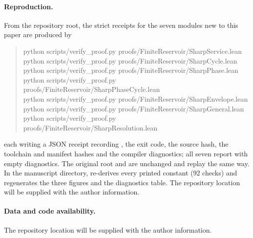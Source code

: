 \documentclass[11pt,a4paper]{article}
\newcommand{\RepositoryNote}{The repository location will be supplied with the author information.}
\theoremstyle{plain}
\theoremstyle{definition}
\theoremstyle{remark}
\begin{document}
\paragraph{Reproduction.}
From the repository root, the strict receipts for the seven modules new to this paper are produced by
\begin{quote}\small\ttfamily
python scripts/verify\_proof.py proofs/FiniteReservoir/SharpService.lean\\
python scripts/verify\_proof.py proofs/FiniteReservoir/SharpCycle.lean\\
python scripts/verify\_proof.py proofs/FiniteReservoir/SharpPhase.lean\\
python scripts/verify\_proof.py proofs/FiniteReservoir/SharpPhaseCycle.lean\\
python scripts/verify\_proof.py proofs/FiniteReservoir/SharpEnvelope.lean\\
python scripts/verify\_proof.py proofs/FiniteReservoir/SharpGeneral.lean\\
python scripts/verify\_proof.py proofs/FiniteReservoir/SharpResolution.lean
\end{quote}
each writing a JSON receipt recording , the exit code, the source hash, the toolchain and manifest hashes and the compiler diagnostics; all seven report  with empty diagnostics. The original root  and  are unchanged and replay the same way. In the manuscript directory,  re-derives every printed constant (92 checks) and  regenerates the three figures and the diagnostics table. \RepositoryNote

\paragraph{Data and code availability.}
\RepositoryNote



\end{document}
